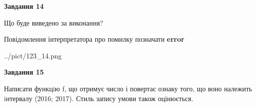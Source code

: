 \documentclass[11pt, ukrainian]{article}
\begin{document}
{\begin {large}
{\begin {center}\textbf{Завдання 14}\end {center}}\par
Що буде виведено за виконання? \par
Повідомлення інтерпретатора про помилку позначати \textbf{error}

\begin{center}
	{../pict/123_14.png}
\end{center}
\newpage

{\begin {center}\textbf{Завдання 15}\end {center}}\par

Написати функцiю f, що отримує число і повертає ознаку того, що воно належить iнтервалу (2016; 2017). Стиль запису умови також оцінюється.\par
\newpage

\end {large}}
\end{document}
